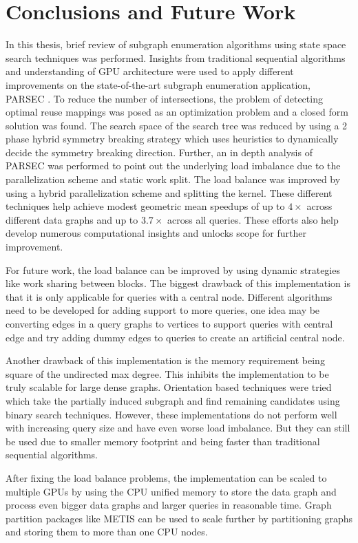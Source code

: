 \chapter{Conclusions and Future Work}\label{chap:conclusions}

In this thesis, brief review of subgraph enumeration algorithms using state space search techniques was performed.
Insights from traditional sequential algorithms and understanding of GPU architecture were used to apply different improvements on the state-of-the-art subgraph enumeration application, PARSEC \cite{PARSEC_VD}.
To reduce the number of intersections, the problem of detecting optimal reuse mappings was posed as an optimization problem and a closed form solution was found.
The search space of the search tree was reduced by using a 2 phase hybrid symmetry breaking strategy which uses heuristics to dynamically decide the symmetry breaking direction.
Further, an in depth analysis of PARSEC \cite{PARSEC_VD} was performed to point out the underlying load imbalance due to the parallelization scheme and static work split.
The load balance was improved by using a hybrid parallelization scheme and splitting the kernel.
These different techniques help achieve modest geometric mean speedups of up to $4\times$ across different data graphs and up to $3.7\times$ across all queries.
These efforts also help develop numerous computational insights and unlocks scope for further improvement.

For future work, the load balance can be improved by using dynamic strategies like work sharing between blocks.
The biggest drawback of this implementation is that it is only applicable for queries with a central node.
Different algorithms need to be developed for adding support to more queries, one idea may be converting edges in a query graphs to vertices to support queries with central edge and try adding dummy edges to queries to create an artificial central node. 

Another drawback of this implementation is the memory requirement being square of the undirected max degree. This inhibits the implementation to be truly scalable for large dense graphs.
Orientation based techniques were tried which take the partially induced subgraph and find remaining candidates using binary search techniques. However, these implementations do not perform well with increasing query size and have even worse load imbalance.
But they can still be used due to smaller memory footprint and being faster than traditional sequential algorithms.

After fixing the load balance problems, the implementation can be scaled to multiple GPUs by using the CPU unified memory to store the data graph and process even bigger data graphs and larger queries in reasonable time.
Graph partition packages like METIS \cite{metis} can be used to scale further by partitioning graphs and storing them to more than one CPU nodes.

